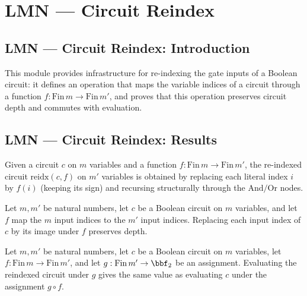\section{LMN --- Circuit Reindex}
\subsection*{LMN --- Circuit Reindex: Introduction}

This module provides infrastructure for re-indexing the gate inputs of a Boolean
circuit: it defines an operation that maps the variable indices of a circuit through
a function $f : \mathrm{Fin}\,m \to \mathrm{Fin}\,m'$, and proves that this operation
preserves circuit depth and commutes with evaluation.

\subsection*{LMN --- Circuit Reindex: Results}

\begin{definition}
\label{BoolCircuit.TreeCircuit.reidx}
\leanok
{}
Given a circuit $c$ on $m$ variables and a function $f : \mathrm{Fin}\,m \to \mathrm{Fin}\,m'$,
the re-indexed circuit $\mathrm{reidx}(c, f)$ on $m'$ variables is obtained by replacing
each literal index $i$ by $f(i)$ (keeping its sign) and recursing structurally through the
$\mathrm{And}/\mathrm{Or}$ nodes.
\end{definition}

\begin{theorem}
\label{BoolCircuit.TreeCircuit.reidx_depth}
\leanok
{}
Let $m,m'$ be natural numbers, let $c$ be a Boolean circuit on $m$ variables, and let
$f$ map the $m$ input indices to the $m'$ input indices. Replacing each input index of
$c$ by its image under $f$ preserves depth.
\end{theorem}

\begin{theorem}
\label{BoolCircuit.TreeCircuit.reidx_eval}
\leanok
{}
Let $m,m'$ be natural numbers, let $c$ be a Boolean circuit on $m$ variables, let $f :
\mathrm{Fin}\,m \to \mathrm{Fin}\,m'$, and let $g : \mathrm{Fin}\,m' \to \bbf_2$ be an
assignment. Evaluating the reindexed circuit under $g$ gives the same value as
evaluating $c$ under the assignment $g \circ f$.
\end{theorem}

